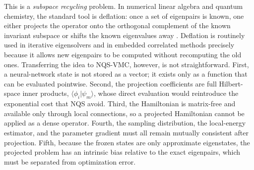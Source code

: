 \documentclass[11pt,a4paper]{article}
\newcommand{\braket}[2]{\langle #1\vert #2\rangle}
\begin{document}
This is a \emph{subspace recycling} problem. In numerical linear algebra and quantum chemistry, the standard tool is deflation: once a set of eigenpairs is known, one either projects the operator onto the orthogonal complement of the known invariant subspace or shifts the known eigenvalues away \citep{saad2011,wang1994}. Deflation is routinely used in iterative eigensolvers and in embedded correlated methods precisely because it allows new eigenpairs to be computed without recomputing the old ones. Transferring the idea to NQS-VMC, however, is not straightforward. First, a neural-network state is not stored as a vector; it exists only as a function that can be evaluated pointwise. Second, the projection coefficients are full Hilbert-space inner products, $\braket{\phi_i}{\psi_m}$, whose direct evaluation would reintroduce the exponential cost that NQS avoid. Third, the Hamiltonian is matrix-free and available only through local connections, so a projected Hamiltonian cannot be applied as a dense operator. Fourth, the sampling distribution, the local-energy estimator, and the parameter gradient must all remain mutually consistent after projection. Fifth, because the frozen states are only approximate eigenstates, the projected problem has an intrinsic bias relative to the exact eigenpairs, which must be separated from optimization error.
\end{document}
